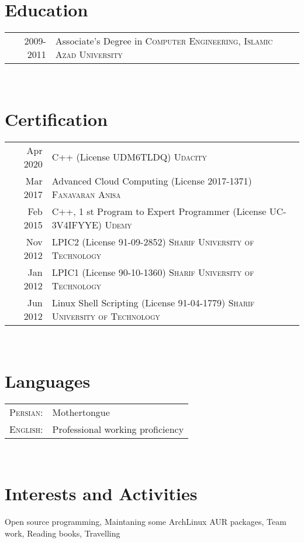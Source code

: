 \documentclass[a4paper,11pt]{article}
\begin{document}
\section{Education}
\begin{tabular}{rp{12cm}}

    \textsc{} 2009-2011 & Associate’s Degree in \textsc{Computer Engineering},
    \textsc{Islamic Azad University}\\

\end{tabular}\\

\section{Certification}
\begin{tabular}{rp{12cm}}

    \textsc{} Apr 2020 & C++ (License UDM6TLDQ) \textsc{Udacity}\\
    \textsc{} Mar 2017 & Advanced Cloud Computing (License 2017-1371) \textsc{Fanavaran Anisa}\\
    \textsc{} Feb 2015 & C++, 1 st Program to Expert Programmer (License UC-3V4IFYYE) \textsc{Udemy}\\
    \textsc{} Nov 2012 & LPIC2 (License 91-09-2852) \textsc{Sharif University of Technology}\\
    \textsc{} Jan 2012 & LPIC1 (License 90-10-1360) \textsc{Sharif University of Technology}\\
    \textsc{} Jun 2012 & Linux Shell Scripting (License 91-04-1779) \textsc{Sharif University of Technology}\\

\end{tabular}\\

\section{Languages}
\begin{tabular}{rl}

    \textsc{Persian:} & Mothertongue\\
    \textsc{English:} & Professional working proficiency\\

\end{tabular}\\

\section{Interests and Activities}

    Open source programming,
    Maintaning some ArchLinux AUR packages,
    Team work,
    Reading books,
    Travelling
\end{document}
